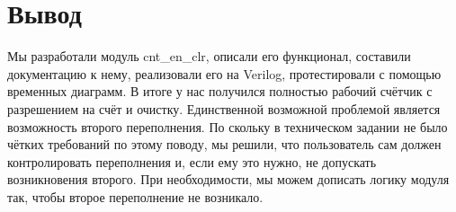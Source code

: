 \documentclass[12pt, a4paper]{article}
\begin{document}

	\section{Вывод}

	Мы разработали модуль cnt\_en\_clr, описали его функционал, составили документацию к нему, реализовали его на Verilog, протестировали с помощью временных диаграмм. В итоге у нас получился полностью рабочий счётчик с разрешением на счёт и очистку. Единственной возможной проблемой является возможность второго переполнения. По скольку в техническом задании не было чётких требований по этому поводу, мы решили, что пользователь сам должен контролировать переполнения и, если ему это нужно, не допускать возникновения второго. При необходимости, мы можем дописать логику модуля так, чтобы второе переполнение не возникало.  
		
\end{document}
